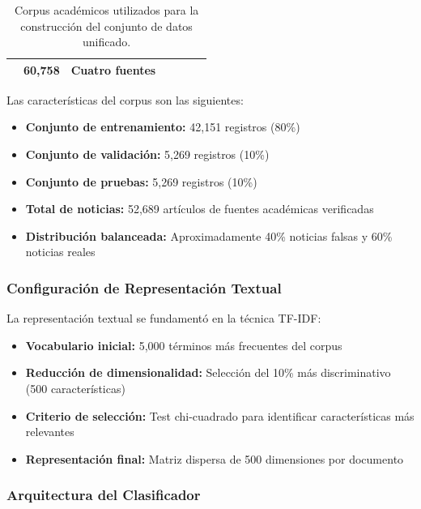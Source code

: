 \begin{table}[htbp]
{\begin{tabular}{|c|l|l|c|c|l|c|}
\hline
\rowcolor{HeaderBlue!20}
\multicolumn{5}{|c|}{\textbf{TOTAL CORPUS ACADÉMICOS}} & \textbf{60,758} & \textbf{Cuatro fuentes} \\
\hline
\end{tabular}
}
\caption{Corpus académicos utilizados para la construcción del conjunto de datos unificado.}
\label{tab:corpus_academicos_resultados}
\end{table}

Las características del corpus son las siguientes:

\begin{itemize}
    \item \textbf{Conjunto de entrenamiento:} 42,151 registros (80\%)
    \item \textbf{Conjunto de validación:} 5,269 registros (10\%)
    \item \textbf{Conjunto de pruebas:} 5,269 registros (10\%)
    \item \textbf{Total de noticias:} 52,689 artículos de fuentes académicas verificadas
    \item \textbf{Distribución balanceada:} Aproximadamente 40\% noticias falsas y 60\% noticias reales
\end{itemize}

\subsubsection{Configuración de Representación Textual}

La representación textual se fundamentó en la técnica TF-IDF:

\begin{itemize}
    \item \textbf{Vocabulario inicial:} 5,000 términos más frecuentes del corpus
    \item \textbf{Reducción de dimensionalidad:} Selección del 10\% más discriminativo (500 características)
    \item \textbf{Criterio de selección:} Test chi-cuadrado para identificar características más relevantes
    \item \textbf{Representación final:} Matriz dispersa de 500 dimensiones por documento
\end{itemize}

\subsubsection{Arquitectura del Clasificador}

